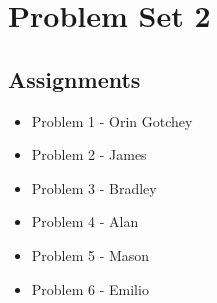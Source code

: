 \documentclass{article}
\begin{document}
\section{Problem Set 2}
\subsection*{Assignments}
\begin{itemize}
	\item Problem 1 - Orin Gotchey
	\item Problem 2 - James
	\item Problem 3 - Bradley
	\item Problem 4 - Alan
	\item Problem 5 - Mason
	\item Problem 6 - Emilio
\end{itemize}
\end{document}
